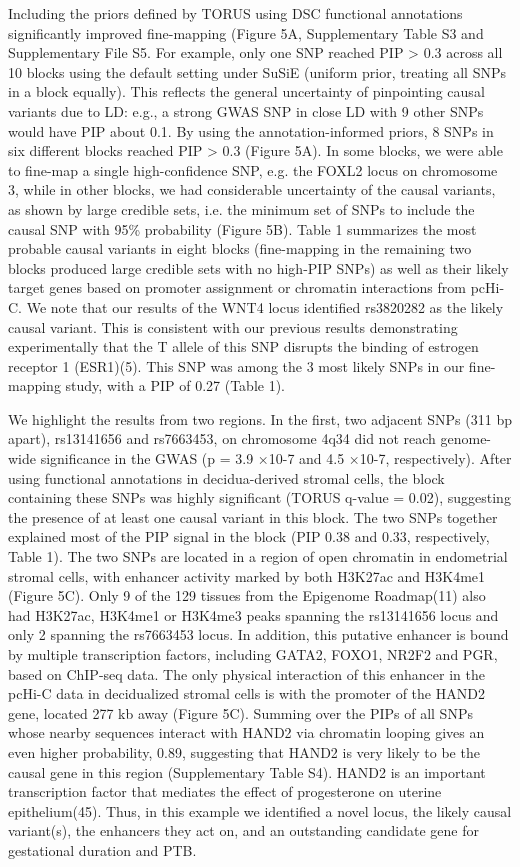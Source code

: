 Including the priors defined by TORUS using DSC functional annotations significantly improved fine-mapping (Figure 5A, Supplementary Table S3 and Supplementary File S5. For example, only one SNP reached PIP > 0.3 across all 10 blocks using the default setting under SuSiE (uniform prior, treating all SNPs in a block equally). This reflects the general uncertainty of pinpointing causal variants due to LD: e.g., a strong GWAS SNP in close LD with 9 other SNPs would have PIP about 0.1. By using the annotation-informed priors, 8 SNPs in six different blocks reached PIP > 0.3 (Figure 5A). In some blocks, we were able to fine-map a single high-confidence SNP, e.g. the FOXL2 locus on chromosome 3, while in other blocks, we had considerable uncertainty of the causal variants, as shown by large credible sets, i.e. the minimum set of SNPs to include the causal SNP with 95\% probability (Figure 5B). Table 1 summarizes the most probable causal variants in eight blocks (fine-mapping in the remaining two blocks produced large credible sets with no high-PIP SNPs) as well as their likely target genes based on promoter assignment or chromatin interactions from pcHi-C. We note that our results of the WNT4 locus identified rs3820282 as the likely causal variant. This is consistent with our previous results demonstrating experimentally that the T allele of this SNP disrupts the binding of estrogen receptor 1 (ESR1)(5). This SNP was among the 3 most likely SNPs in our fine-mapping study, with a PIP of 0.27 (Table 1). 



We highlight the results from two regions. In the first, two adjacent SNPs (311 bp apart), rs13141656 and rs7663453, on chromosome 4q34 did not reach genome-wide significance in the GWAS (p = 3.9 ×10-7 and 4.5 ×10-7, respectively). After using functional annotations in decidua-derived stromal cells, the block containing these SNPs was highly significant (TORUS q-value = 0.02), suggesting the presence of at least one causal variant in this block. The two SNPs together explained most of the PIP signal in the block (PIP 0.38 and 0.33, respectively, Table 1). The two SNPs are located in a region of open chromatin in endometrial stromal cells, with enhancer activity marked by both H3K27ac and H3K4me1 (Figure 5C). Only 9 of the 129 tissues from the Epigenome Roadmap(11) also had H3K27ac, H3K4me1 or H3K4me3 peaks spanning the rs13141656 locus and only 2 spanning the rs7663453 locus. In addition, this putative enhancer is bound by multiple transcription factors, including GATA2, FOXO1, NR2F2 and PGR, based on ChIP-seq data. The only physical interaction of this enhancer in the pcHi-C data in decidualized stromal cells is with the promoter of the HAND2 gene, located 277 kb away (Figure 5C). Summing over the PIPs of all SNPs whose nearby sequences interact with HAND2 via chromatin looping gives an even higher probability, 0.89, suggesting that HAND2 is very likely to be the causal gene in this region (Supplementary Table S4). HAND2 is an important transcription factor that mediates the effect of progesterone on uterine epithelium(45). Thus, in this example we identified a novel locus, the likely causal variant(s), the enhancers they act on, and an outstanding candidate gene for gestational duration and PTB.  

